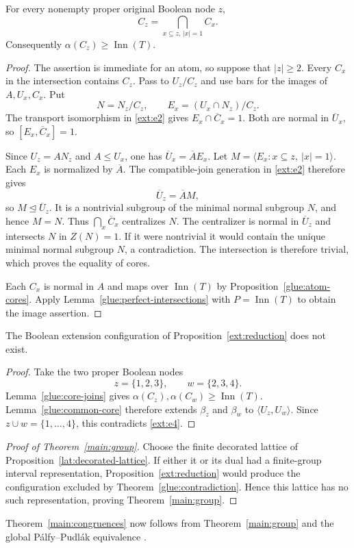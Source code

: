 \begin{lemma}
\label{glue:core-joins}
For every nonempty proper original Boolean node $z$,
\[
             C_z=\bigcap_{x\subseteq z,\,|x|=1}C_x.
\]
Consequently $\alpha(C_z)\ge\operatorname{Inn}(T)$.
\end{lemma}
\begin{proof}
The assertion is immediate for an atom, so suppose that $|z|\ge2$.
Every $C_x$ in the intersection contains $C_z$.  Pass to $U_z/C_z$
and use bars for the images of $A,U_x,C_x$.  Put
\[
 N=N_z/C_z,\qquad E_x=(U_x\cap N_z)/C_z.
\]
The transport isomorphism in \ref{ext:e2} gives
$E_x\cap\overline C_x=1$.  Both are normal in $\overline U_x$, so
$[E_x,\overline C_x]=1$.

Since $U_z=AN_z$ and $A\le U_x$, one has
$\overline U_x=\overline A E_x$.
Let $M=\langle E_x:x\subseteq z,\ |x|=1\rangle$.
Each $E_x$ is normalized by $\overline A$.  The compatible-join
generation in \ref{ext:e2} therefore gives
\[
                       \overline U_z=\overline A M,
\]
so $M\trianglelefteq\overline U_z$.  It is a nontrivial subgroup of
the minimal normal subgroup $N$, and hence $M=N$.
Thus $\bigcap_x\overline C_x$ centralizes $N$.
The centralizer is normal in $\overline U_z$ and intersects $N$ in
$Z(N)=1$.  If it were nontrivial it would contain the unique minimal
normal subgroup $N$, a contradiction.  The intersection is therefore
trivial, which proves the equality of cores.

Each $C_x$ is normal in $A$ and maps over $\operatorname{Inn}(T)$ by
Proposition~\ref{glue:atom-cores}.  Apply
Lemma~\ref{glue:perfect-intersections} with
$P=\operatorname{Inn}(T)$ to obtain the image assertion.
\end{proof}

\begin{theorem}\label{glue:contradiction}
The Boolean extension configuration of
Proposition~\ref{ext:reduction} does not exist.
\end{theorem}
\begin{proof}
Take the two proper Boolean nodes
\[
              z=\{1,2,3\},\qquad w=\{2,3,4\}.
\]
Lemma~\ref{glue:core-joins} gives
$\alpha(C_z),\alpha(C_w)\ge\operatorname{Inn}(T)$.
Lemma~\ref{glue:common-core} therefore extends $\beta_z$ and $\beta_w$
to $\langle U_z,U_w\rangle$.  Since $z\cup w=\{1,\ldots,4\}$, this
contradicts \ref{ext:e4}.
\end{proof}

\begin{proof}[Proof of Theorem~\ref{main:group}]
Choose the finite decorated lattice of
Proposition~\ref{lat:decorated-lattice}.  If either it or its dual had a
finite-group interval representation, Proposition~\ref{ext:reduction}
would produce the configuration excluded by
Theorem~\ref{glue:contradiction}.  Hence this lattice has no such
representation, proving Theorem~\ref{main:group}.
\end{proof}

Theorem~\ref{main:congruences} now follows from
Theorem~\ref{main:group} and the global P\'alfy--Pudl\'ak equivalence
\cite[Theorem~2]{PalfyPudlak1980}.
